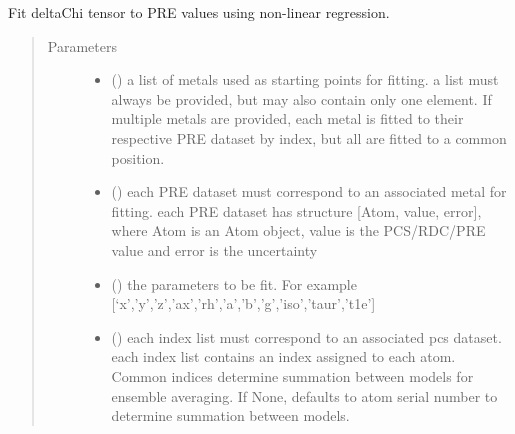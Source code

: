 \documentclass[a4paper,10pt,english,openany,oneside]{sphinxmanual}
\begin{document}
\begin{fulllineitems}
\label{\detokenize{reference/generated/paramagpy.fit.nlr_fit_metal_from_pre:paramagpy.fit.nlr_fit_metal_from_pre}}
Fit deltaChi tensor to PRE values using non-linear regression.
\begin{quote}\begin{description}
\item[{Parameters}] \leavevmode\begin{itemize}
\item {} 
 () \textendash{} a list of metals used as starting points for fitting.
a list must always be provided, but may also contain
only one element. If multiple metals are provided, each metal
is fitted to their respective PRE dataset by index, but all are
fitted to a common position.

\item {} 
 () \textendash{} each PRE dataset must correspond to an associated metal for fitting.
each PRE dataset has structure {[}Atom, value, error{]}, where Atom is
an Atom object, value is the PCS/RDC/PRE value
and error is the uncertainty

\item {} 
 () \textendash{} the parameters to be fit.
For example {[}‘x’,’y’,’z’,’ax’,’rh’,’a’,’b’,’g’,’iso’,’taur’,’t1e’{]}

\item {} 
 (\sphinxstyleliteralemphasis{\sphinxupquote{, }}) \textendash{} each index list must correspond to an associated pcs dataset.
each index list contains an index assigned to each atom.
Common indices determine summation between models
for ensemble averaging.
If None, defaults to atom serial number to determine summation
between models.


\end{itemize}
\end{description}
\end{quote}
\end{fulllineitems}
\end{document}

